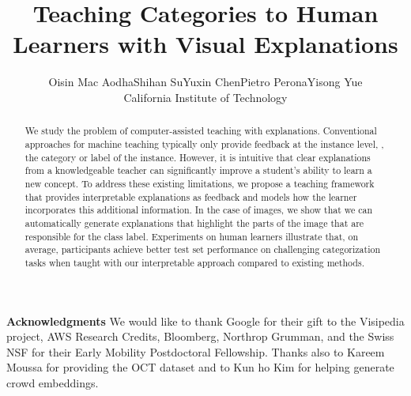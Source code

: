\documentclass[10pt,twocolumn,letterpaper]{article}
\begin{document}
\title{Teaching Categories to Human Learners with Visual Explanations}

\author{Oisin Mac Aodha\hspace{20pt}Shihan Su\hspace{20pt}Yuxin Chen\hspace{20pt}Pietro Perona\hspace{20pt}Yisong Yue\\
California Institute of Technology
}


\maketitle

\begin{abstract}
We study the problem of computer-assisted teaching with explanations.  
Conventional approaches for machine teaching typically only provide feedback at the instance level, \eg, the category or label of the instance.  
However, it is intuitive that clear explanations from a knowledgeable teacher can significantly improve a student's ability to learn a new concept. 
To address these existing limitations, we propose a teaching framework that provides interpretable explanations as feedback and models how the learner incorporates this additional information.  
In the case of images, we show that we can automatically generate explanations that highlight the parts of the image that are responsible for the class label.
Experiments on human learners illustrate that, on average, participants achieve better test set performance on challenging categorization tasks when taught with our interpretable approach compared to existing methods. 
\end{abstract}










\small{
\noindent\textbf{Acknowledgments} We would like to thank Google for their gift to the Visipedia project, AWS Research Credits, Bloomberg, Northrop Grumman, and the Swiss NSF for their Early Mobility Postdoctoral Fellowship. Thanks also to Kareem Moussa for providing the OCT dataset and to Kun ho Kim for helping generate crowd embeddings.
}


{\small
\vspace{10pt}


}

\clearpage

\end{document}
